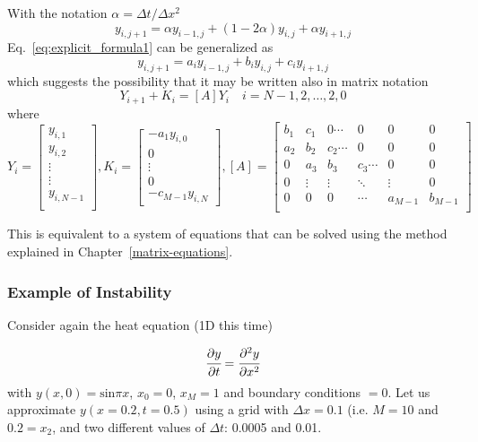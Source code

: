 With the notation $\alpha = \Delta t/\Delta x^2$
\begin{equation}
y_{i,j+1} = \alpha y_{i−1,j} + (1 − 2\alpha)y_{i,j} + \alpha y_{i+1,j} 
\label{eq:explicit_formula1}
\end{equation}
Eq.~\ref{eq:explicit_formula1} can be generalized as
\begin{equation}
y_{i,j+1} = a_i y_{i−1,j} + b_i y_{i,j} + c_i y_{i+1,j} 
\label{eq:explicit_formula2}
\end{equation}
\noindent
which suggests the possibility that it may be written also in matrix notation
\begin{equation}
Y_{i+1} + K_i = [A]Y_i \quad i=N-1, 2,\ldots,2,0
\end{equation}
\noindent
where
\begin{equation*}
Y_i =
\begin{bmatrix}
y_{i, 1}\\
y_{i, 2}\\
\vdots\\
\vdots\\
y_{i,N-1}\\
\end{bmatrix},
K_i=
\begin{bmatrix}
-a_1 y_{i,0}\\
0\\
\vdots\\
0\\
-c_{M-1}y_{i,N}
\end{bmatrix},
[A] = 
\begin{bmatrix}
b_1 & c_1 & 0 \cdots & 0 & 0 & 0 \\
a_2 & b_2 & c_2 \cdots & 0 & 0 & 0\\
0  & a_3 & b_3 & c_3\cdots & 0 & 0 \\
0  & \vdots & \vdots & \ddots & \vdots & 0 \\
0 & 0 & 0 & \cdots & a_{M-1} & b_{M-1} \\
\end{bmatrix}
\end{equation*}

This is equivalent to a system of equations that can be solved using the method explained in Chapter~\ref{matrix-equations}.

\subsubsection{Example of Instability}
Consider again the heat equation (1D this time)

\begin{equation}
\cfrac{\partial y}{\partial t} = \cfrac{\partial^2 y}{\partial x^2}
\end{equation}
\noindent
with $y(x, 0) = \textrm{sin}\pi x$, $x_{0} = 0$, $x_M = 1$ and boundary conditions $= 0$. Let us approximate $y(x = 0.2, t = 0.5)$ using a grid with $\Delta x = 0.1$ (i.e. $M = 10$ and $0.2 = x_2$, and two different values of $\Delta t$: 0.0005 and 0.01.

